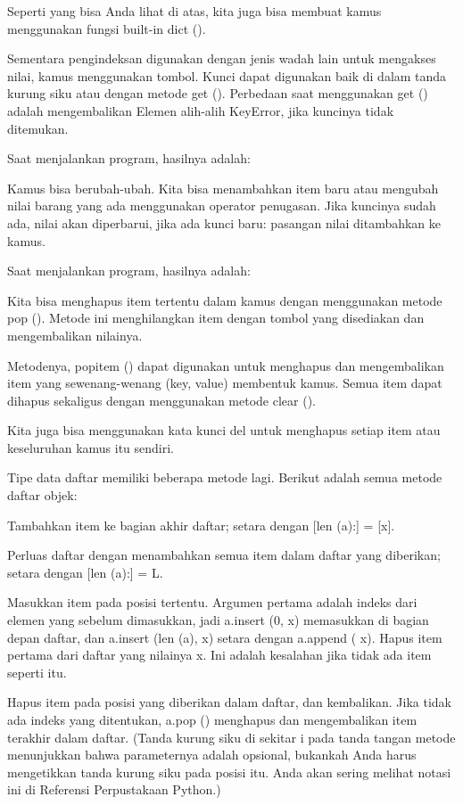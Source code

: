 Seperti yang bisa Anda lihat di atas, kita juga bisa membuat kamus menggunakan fungsi built-in dict (). 

Sementara pengindeksan digunakan dengan jenis wadah lain untuk mengakses nilai, kamus menggunakan tombol. Kunci dapat digunakan baik di dalam tanda kurung siku atau dengan metode get (). Perbedaan saat menggunakan get () adalah mengembalikan Elemen alih-alih KeyError, jika kuncinya tidak ditemukan. \par

Saat menjalankan program, hasilnya adalah: 

Kamus bisa berubah-ubah. Kita bisa menambahkan item baru atau mengubah nilai barang yang ada menggunakan operator penugasan. 
Jika kuncinya sudah ada, nilai akan diperbarui, jika ada kunci baru: pasangan nilai ditambahkan ke kamus. 

Saat menjalankan program, hasilnya adalah: 

Kita bisa menghapus item tertentu dalam kamus dengan menggunakan metode pop (). Metode ini menghilangkan item dengan tombol yang disediakan dan mengembalikan nilainya. \par

Metodenya, popitem () dapat digunakan untuk menghapus dan mengembalikan item yang sewenang-wenang (key, value) membentuk kamus. Semua item dapat dihapus sekaligus dengan menggunakan metode clear (). \par

Kita juga bisa menggunakan kata kunci del untuk menghapus setiap item atau keseluruhan kamus itu sendiri. 

Tipe data daftar memiliki beberapa metode lagi. Berikut adalah semua metode daftar objek: 

Tambahkan item ke bagian akhir daftar; setara dengan [len (a):] = [x]. 

Perluas daftar dengan menambahkan semua item dalam daftar yang diberikan; setara dengan [len (a):] = L. 
 
Masukkan item pada posisi tertentu. Argumen pertama adalah indeks dari elemen yang sebelum dimasukkan, jadi a.insert (0, x) memasukkan di bagian depan daftar, dan a.insert (len (a), x) setara dengan a.append ( x). 
Hapus item pertama dari daftar yang nilainya x. Ini adalah kesalahan jika tidak ada item seperti itu. 
 
Hapus item pada posisi yang diberikan dalam daftar, dan kembalikan. Jika tidak ada indeks yang ditentukan, a.pop () menghapus dan mengembalikan item terakhir dalam daftar. (Tanda kurung siku di sekitar i pada tanda tangan metode menunjukkan bahwa parameternya adalah opsional, bukankah Anda harus mengetikkan tanda kurung siku pada posisi itu. Anda akan sering melihat notasi ini di Referensi Perpustakaan Python.) \par

